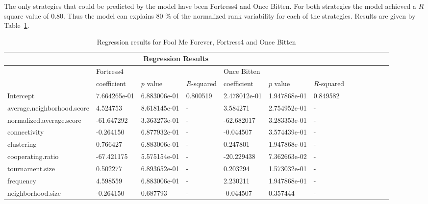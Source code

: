 The only strategies that could be predicted by the model have been Fortress4 and
Once Bitten. For both strategies the model achieved a \(R\) square value of
0.80. Thus the model can explains 80 \% of the normalized rank variability for
each of the strategies. Results are given by Table~\ref{reg-for-r-top}.

\begin{table}[!hbtp]
	\centering
	\begin{adjustbox}{width=0.6\textwidth}
		\small
		\begin{tabular}{|l|l|l|l|l|l|l|l|l|l|l|l|l|}
			\hline
			\multicolumn{7}{|c|}{Regression Results}                                                                       \\ \hline
			&	\multicolumn{3}{l|}{Fortress4} & \multicolumn{3}{l|}{Once Bitten}\\ \hline
			  											   & coefficient & \(p\) value & \(R\)-squared & coefficient & \(p\) value & \(R\)-squared \\ \hline
			Intercept 								 & 7.664265e-01	& 6.883006e-01	& 0.800519	& 2.478012e-01 & 1.947868e-01 & 0.849582	\\ \hline
			average.neighborhood.score & 4.524753			& 8.618145e-01	& -					& 3.584271		 & 2.754952e-01	& -         \\ \hline
			normalized.average.score	 & -61.647292		& 3.363273e-01	& -					&-62.682017 	 & 3.283353e-01	& -         \\ \hline
			connectivity							 & -0.264150		& 6.877932e-01	& -					&-0.044507 		 & 3.574439e-01	& -         \\ \hline
			clustering  							 & 0.766427			& 6.883006e-01	& -					& 0.247801 		 & 1.947868e-01	& -         \\ \hline
			cooperating.ratio					 & -67.421175		& 5.575154e-01	& -					&-20.229438		 & 7.362663e-02	& -         \\ \hline
			tournament.size						 & 0.502277			& 6.893652e-01	& -					&0.203294  		 & 1.573032e-01	& -         \\ \hline
			frequency									 & 4.598559			& 6.883006e-01	& -					&2.230211  		 & 1.947868e-01	& -         \\ \hline
			neighborhood.size			   	 & -0.264150			& 0.687793		& -					&-0.044507 		 & 0.357444	& -         		\\ \hline

		\end{tabular}
	\end{adjustbox}
	\caption{Regression results for ​Fool Me Forever, Fortress4 and Once Bitten}
	\label{reg-for-r-top}
\end{table}

